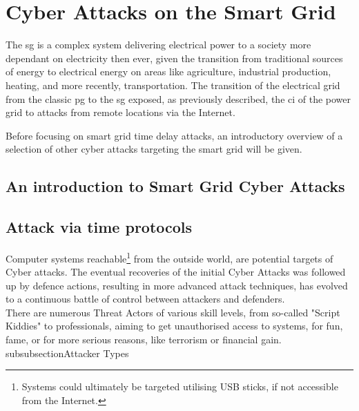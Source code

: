 

\chapter{Cyber Attacks on the Smart Grid}

The \acrfull{sg} is a complex system delivering electrical power to a society more dependant on electricity then ever, given the transition from traditional sources of energy to electrical energy on areas like agriculture, industrial production, heating, and more recently, transportation.
The transition of the electrical grid from the classic \acrlong{pg} to the \acrlong{sg} exposed, as previously described, the \acrlong{ci} of the power grid to attacks from remote locations via the Internet.

Before focusing on smart grid time delay attacks, an introductory overview of a selection of other cyber attacks targeting  the smart grid will be given.



\section{An introduction to Smart Grid Cyber Attacks}


\section{Attack via time protocols}

Computer systems reachable\footnote{Systems could ultimately be targeted utilising USB sticks, if not accessible from the Internet.} from the outside world,  are potential targets of Cyber attacks. The eventual recoveries of the initial Cyber Attacks was followed up by defence actions, resulting in more advanced attack techniques, has evolved to a continuous battle of control between attackers and defenders. \\


There are numerous Threat Actors of various skill levels, from so-called "Script Kiddies" to professionals, aiming to get unauthorised access to systems, for fun, fame, or for more serious reasons, like terrorism or financial gain. 
subsubsection{Attacker Types}

